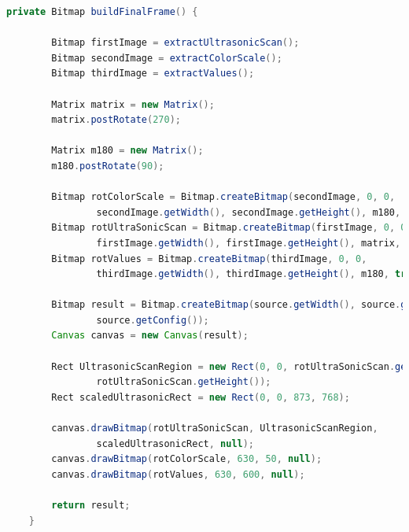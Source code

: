 \begin{lstlisting}[caption=Methode zum Zusammenstellen des Ausgabeframes, label=lst:buildFinalFrame, language=Java]
private Bitmap buildFinalFrame() {

        Bitmap firstImage = extractUltrasonicScan();
        Bitmap secondImage = extractColorScale();
        Bitmap thirdImage = extractValues();

        Matrix matrix = new Matrix();
        matrix.postRotate(270);

        Matrix m180 = new Matrix();
        m180.postRotate(90);

        Bitmap rotColorScale = Bitmap.createBitmap(secondImage, 0, 0,
                secondImage.getWidth(), secondImage.getHeight(), m180, true);
        Bitmap rotUltraSonicScan = Bitmap.createBitmap(firstImage, 0, 0,
                firstImage.getWidth(), firstImage.getHeight(), matrix, true);
        Bitmap rotValues = Bitmap.createBitmap(thirdImage, 0, 0,
                thirdImage.getWidth(), thirdImage.getHeight(), m180, true);

        Bitmap result = Bitmap.createBitmap(source.getWidth(), source.getHeight(),
                source.getConfig());
        Canvas canvas = new Canvas(result);

        Rect UltrasonicScanRegion = new Rect(0, 0, rotUltraSonicScan.getWidth(),
                rotUltraSonicScan.getHeight());
        Rect scaledUltrasonicRect = new Rect(0, 0, 873, 768);

        canvas.drawBitmap(rotUltraSonicScan, UltrasonicScanRegion,
                scaledUltrasonicRect, null);
        canvas.drawBitmap(rotColorScale, 630, 50, null);
        canvas.drawBitmap(rotValues, 630, 600, null);

        return result;
    }
\end{lstlisting}

